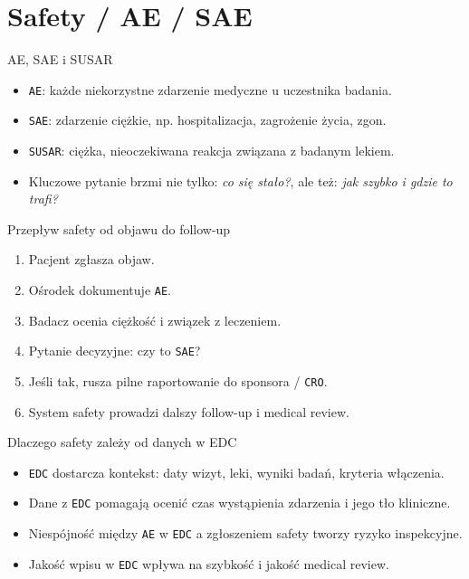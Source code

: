 \section{Safety / AE / SAE}


\begin{frame}{AE, SAE i SUSAR}
  \begin{itemize}
    \item \texttt{AE}: każde niekorzystne zdarzenie medyczne u uczestnika badania.
    \item \texttt{SAE}: zdarzenie ciężkie, np. hospitalizacja, zagrożenie życia, zgon.
    \item \texttt{SUSAR}: ciężka, nieoczekiwana reakcja związana z badanym lekiem.
    \item Kluczowe pytanie brzmi nie tylko: \emph{co się stało?}, ale też: \emph{jak szybko i gdzie to trafi?}
  \end{itemize}
\end{frame}

\begin{frame}{Przepływ safety od objawu do follow-up}
  \begin{enumerate}
    \item Pacjent zgłasza objaw.
    \item Ośrodek dokumentuje \texttt{AE}.
    \item Badacz ocenia ciężkość i związek z leczeniem.
    \item Pytanie decyzyjne: czy to \texttt{SAE}?
    \item Jeśli tak, rusza pilne raportowanie do sponsora / \texttt{CRO}.
    \item System safety prowadzi dalszy follow-up i medical review.
  \end{enumerate}
\end{frame}

\begin{frame}{Dlaczego safety zależy od danych w EDC}
  \begin{itemize}
    \item \texttt{EDC} dostarcza kontekst: daty wizyt, leki, wyniki badań, kryteria włączenia.
    \item Dane z \texttt{EDC} pomagają ocenić czas wystąpienia zdarzenia i jego tło kliniczne.
    \item Niespójność między \texttt{AE} w \texttt{EDC} a zgłoszeniem safety tworzy ryzyko inspekcyjne.
    \item Jakość wpisu w \texttt{EDC} wpływa na szybkość i jakość medical review.
  \end{itemize}
\end{frame}

